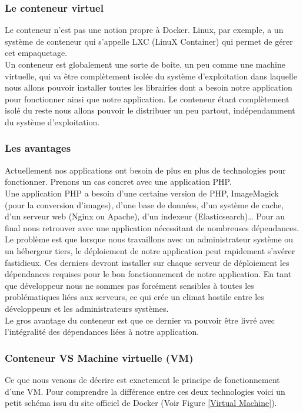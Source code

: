       \subsubsection{Le conteneur virtuel}
      Le conteneur n’est pas une notion propre à Docker. Linux, par exemple, a un système de conteneur qui s’appelle LXC (LinuX Container) qui permet de gérer cet empaquetage.\\

      Un conteneur est globalement une sorte de boite, un peu comme une machine virtuelle, qui va être complètement isolée du système d’exploitation dans laquelle nous allons pouvoir installer toutes les librairies dont a besoin notre application pour fonctionner ainsi que notre application. Le conteneur étant complètement isolé du reste nous allons pouvoir le distribuer un peu partout, indépendamment du système d’exploitation.

      \subsubsection{Les avantages}
      Actuellement nos applications ont besoin de plus en plus de technologies pour fonctionner. Prenons un cas concret avec une application PHP.\\

      Une application PHP a besoin d’une certaine version de PHP, ImageMagick (pour la conversion d’images), d’une base de données, d’un système de cache, d’un serveur web (Nginx ou Apache), d’un indexeur (Elasticsearch)… Pour au final nous retrouver avec une application nécessitant de nombreuses dépendances.\\

      Le problème est que lorsque nous travaillons avec un administrateur système ou un hébergeur tiers, le déploiement de notre application peut rapidement s’avérer fastidieux. Ces derniers devront installer sur chaque serveur de déploiement les dépendances requises pour le bon fonctionnement de notre application. En tant que développeur nous ne sommes pas forcément sensibles à toutes les problématiques liées aux serveurs, ce qui crée un climat hostile entre les développeurs et les administrateurs systèmes.\\

      Le gros avantage du conteneur est que ce dernier va pouvoir être livré avec l’intégralité des dépendances liées à notre application.

      \subsubsection{Conteneur VS Machine virtuelle (VM)}
      Ce que nous venons de décrire est exactement le principe de fonctionnement d’une VM. Pour comprendre la différence entre ces deux technologies voici un petit schéma issu du site officiel de Docker (Voir Figure \ref{Virtual Machine}).\\

